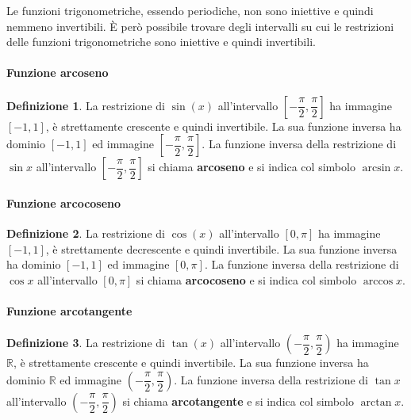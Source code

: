\documentclass{article}
\theoremstyle{plain}
\theoremstyle{definition}
\newtheorem{defn}{Definizione}[section]
\theoremstyle{remark}
\begin{document}
Le funzioni trigonometriche, essendo periodiche, non sono iniettive e quindi nemmeno invertibili. 
È però possibile trovare degli intervalli su cui le restrizioni delle funzioni trigonometriche sono iniettive e quindi invertibili.

\vspace{10pt}

\paragraph{Funzione arcoseno}
\begin{bxthm}
\begin{defn}
    La restrizione di $\sin(x)$ all'intervallo $\left[-\dfrac{\pi}{2},\dfrac{\pi}{2}\right]$ ha immagine $[-1,1]$, è strettamente crescente e quindi invertibile. La sua funzione inversa ha dominio $[-1,1]$ ed immagine $\left[-\dfrac{\pi}{2},\dfrac{\pi}{2}\right]$. 
    La funzione inversa della restrizione di $\sin x$ all'intervallo $\left[-\dfrac{\pi}{2},\dfrac{\pi}{2}\right]$ si chiama \textbf{arcoseno} e si indica col simbolo $\arcsin x$.
\end{defn}
\end{bxthm}

\vspace{10pt}

\paragraph{Funzione arcocoseno}
\begin{bxthm}
\begin{defn}
    La restrizione di $\cos(x)$ all'intervallo $[0,\pi]$ ha immagine $[-1,1]$, è strettamente decrescente e quindi invertibile. La sua funzione inversa ha dominio $[-1,1]$ ed immagine $[0,\pi]$. 
    La funzione inversa della restrizione di $\cos x$ all'intervallo $[0,\pi]$ si chiama \textbf{arcocoseno} e si indica col simbolo $\arccos x$.
\end{defn}
\end{bxthm}

\vspace{10pt}

\paragraph{Funzione arcotangente}
\begin{bxthm}
\begin{defn}
    La restrizione di $\tan(x)$ all'intervallo $\left(-\dfrac{\pi}{2},\dfrac{\pi}{2}\right)$ ha immagine $\mathbb{R}$, è strettamente crescente e quindi invertibile. La sua funzione inversa ha dominio $\mathbb{R}$ ed immagine $\left(-\dfrac{\pi}{2},\dfrac{\pi}{2}\right)$. 
    La funzione inversa della restrizione di $\tan x$ all'intervallo $\left(-\dfrac{\pi}{2},\dfrac{\pi}{2}\right)$ si chiama \textbf{arcotangente} e si indica col simbolo $\arctan x$.
\end{defn}
\end{bxthm}
\end{document}
